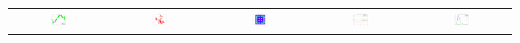 \documentclass{beamer}
\begin{document}
\begin{frame}[containsverbatim]
  \begin{tabular}{@{}c@{}c@{}c@{}c@{}c@{}}
  \includegraphics[width=0.2\textwidth]{figures/plot_kriging.png}&
  \includegraphics[width=0.2\textwidth]{figures/plot_random_walk.png}&
  \includegraphics[width=0.2\textwidth]{figures/plot_sobol_field.png}&
  \includegraphics[width=0.2\textwidth]{figures/plot_monte_carlo.png}&
  \includegraphics[width=0.2\textwidth]{figures/plot_distribution_fitting.png}
  \end{tabular}
\end{frame}
  
  
\end{document}
